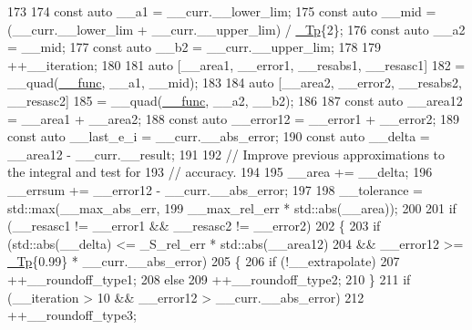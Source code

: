 \begin{DoxyCode}
173 
174           \textcolor{keyword}{const} \textcolor{keyword}{auto} \_\_a1 = \_\_curr.\_\_lower\_lim;
175           \textcolor{keyword}{const} \textcolor{keyword}{auto} \_\_mid = (\_\_curr.\_\_lower\_lim + \_\_curr.\_\_upper\_lim) / \hyperlink{namespace____gnu__cxx_a3b19a9c800ca194374ef9172290f7d79}{\_Tp}\{2\};
176           \textcolor{keyword}{const} \textcolor{keyword}{auto} \_\_a2 = \_\_mid;
177           \textcolor{keyword}{const} \textcolor{keyword}{auto} \_\_b2 = \_\_curr.\_\_upper\_lim;
178 
179           ++\_\_iteration;
180 
181           \textcolor{keyword}{auto} [\_\_area1, \_\_error1, \_\_resabs1, \_\_resasc1]
182             = \_\_quad(\hyperlink{namespace____gnu__cxx_af2b2f0c7a2ae72b922b1afefae5a65b2}{\_\_func}, \_\_a1, \_\_mid);
183 
184           \textcolor{keyword}{auto} [\_\_area2, \_\_error2, \_\_resabs2, \_\_resasc2]
185             = \_\_quad(\hyperlink{namespace____gnu__cxx_af2b2f0c7a2ae72b922b1afefae5a65b2}{\_\_func}, \_\_a2, \_\_b2);
186 
187           \textcolor{keyword}{const} \textcolor{keyword}{auto} \_\_area12 = \_\_area1 + \_\_area2;
188           \textcolor{keyword}{const} \textcolor{keyword}{auto} \_\_error12 = \_\_error1 + \_\_error2;
189           \textcolor{keyword}{const} \textcolor{keyword}{auto} \_\_last\_e\_i = \_\_curr.\_\_abs\_error;
190           \textcolor{keyword}{const} \textcolor{keyword}{auto} \_\_delta = \_\_area12 - \_\_curr.\_\_result;
191 
192           \textcolor{comment}{// Improve previous approximations to the integral and test for}
193           \textcolor{comment}{// accuracy.}
194 
195           \_\_area += \_\_delta;
196           \_\_errsum += \_\_error12 - \_\_curr.\_\_abs\_error;
197 
198           \_\_tolerance = std::max(\_\_max\_abs\_err,
199                                  \_\_max\_rel\_err * std::abs(\_\_area));
200 
201           \textcolor{keywordflow}{if} (\_\_resasc1 != \_\_error1 && \_\_resasc2 != \_\_error2)
202             \{
203               \textcolor{keywordflow}{if} (std::abs(\_\_delta) <= \_S\_rel\_err * std::abs(\_\_area12)
204                   && \_\_error12 >= \hyperlink{namespace____gnu__cxx_a3b19a9c800ca194374ef9172290f7d79}{\_Tp}\{0.99\} * \_\_curr.\_\_abs\_error)
205                 \{
206                   \textcolor{keywordflow}{if} (!\_\_extrapolate)
207                     ++\_\_roundoff\_type1;
208                   \textcolor{keywordflow}{else}
209                     ++\_\_roundoff\_type2;
210                 \}
211               \textcolor{keywordflow}{if} (\_\_iteration > 10 && \_\_error12 > \_\_curr.\_\_abs\_error)
212                 ++\_\_roundoff\_type3;

\end{DoxyCode}
